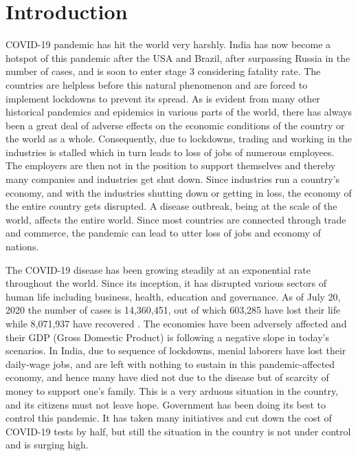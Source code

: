 \documentclass[times,twocolumn,final,authoryear]{elsarticle}
\begin{document}
	
	\section{Introduction}
	
	COVID-19 pandemic has hit the world very harshly. India has now become a hotspot of this pandemic after the USA and Brazil, after surpassing Russia in the number of cases, and is soon to enter stage 3 considering fatality rate. The countries are helpless before this natural phenomenon and are forced to implement lockdowns to prevent its spread. As is evident from many other historical pandemics and epidemics in various parts of the world, there has always been a great deal of adverse effects on the economic conditions of the country or the world as a whole. Consequently, due to lockdowns, trading and working in the industries is stalled which in turn leads to loss of jobs of numerous employees. The employers are then not in the position to support themselves and thereby many companies and industries get shut down. Since industries run a country's economy, and with the industries shutting down or getting in loss, the economy of the entire country gets disrupted. A disease outbreak, being at the scale of the world, affects the entire world. Since most countries are connected through trade and commerce, the pandemic can lead to utter loss of jobs and economy of nations.
	
	The COVID-19 disease has been growing steadily at an exponential rate throughout the world. Since its inception, it has disrupted various sectors of human life including business, health, education and governance. As of July 20, 2020 the number of cases is 14,360,451, out of which 603,285 have lost their life while 8,071,937 have recovered \cite{MOHFW}. The economies have been adversely affected and their GDP (Gross Domestic Product) is following a negative slope in today's scenarios. In India, due to sequence of lockdowns, menial laborers have lost their daily-wage jobs, and are left with nothing to sustain in this pandemic-affected economy, and hence many have died not due to the disease but of scarcity of money to support one's family. This is a very arduous situation in the country, and its citizens must not leave hope. Government has been doing its best to control this pandemic. It has taken many initiatives and cut down the cost of COVID-19 tests by half, but still the situation in the country is not under control and is surging high. 
	
\end{document}
